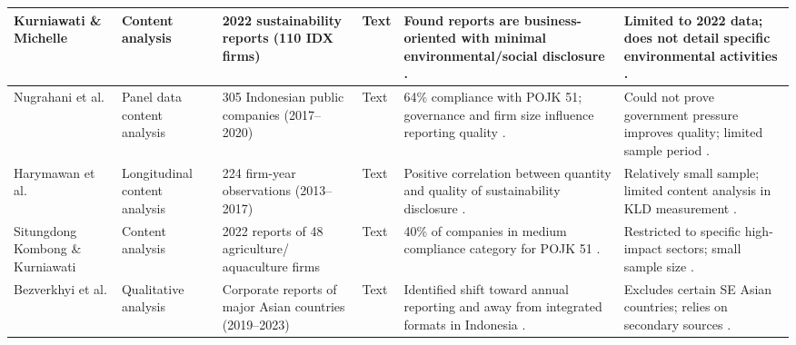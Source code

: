 \begin{landscape}
\begin{table}[p]
\begin{tabularx}{\linewidth}{|p{2.5cm}|p{2cm}|p{3cm}|p{1.8cm}|X|X|}
Kurniawati \& Michelle  \parencite{anggreni_dian_kurniawati_938acf6c} & Content analysis & 2022 sustainability reports (110 IDX firms) & Text & Found reports are business-oriented with minimal environmental/social disclosure  \parencite{anggreni_dian_kurniawati_938acf6c}. & Limited to 2022 data; does not detail specific environmental activities  \parencite{anggreni_dian_kurniawati_938acf6c}. \\ \hline
Nugrahani et al.  \parencite{tri_siwi_nugrahani_056a6914} & Panel data content analysis & 305 Indonesian public companies (2017–2020) & Text & 64\% compliance with POJK 51; governance and firm size influence reporting quality  \parencite{tri_siwi_nugrahani_056a6914}. & Could not prove government pressure improves quality; limited sample period  \parencite{tri_siwi_nugrahani_056a6914}. \\ \hline
Harymawan et al.  \parencite{iman_harymawan_2ef898fe} & Longitudinal content analysis & 224 firm-year observations (2013–2017) & Text & Positive correlation between quantity and quality of sustainability disclosure  \parencite{iman_harymawan_2ef898fe}. & Relatively small sample; limited content analysis in KLD measurement  \parencite{iman_harymawan_2ef898fe}. \\ \hline
Situngdong Kombong \& Kurniawati  \parencite{christine_bawaeda_sitandung_kombong_d03ec902} & Content analysis & 2022 reports of 48 agriculture/ aquaculture firms & Text & 40\% of companies in medium compliance category for POJK 51  \parencite{christine_bawaeda_sitandung_kombong_d03ec902}. & Restricted to specific high-impact sectors; small sample size  \parencite{christine_bawaeda_sitandung_kombong_d03ec902}. \\ \hline
Bezverkhyi et al.  \parencite{kostiantyn_bezverkhyi_e3819b1b} & Qualitative analysis & Corporate reports of major Asian countries (2019–2023) & Text & Identified shift toward annual reporting and away from integrated formats in Indonesia  \parencite{kostiantyn_bezverkhyi_e3819b1b}. & Excludes certain SE Asian countries; relies on secondary sources  \parencite{kostiantyn_bezverkhyi_e3819b1b}. \\ \hline

\end{tabularx}
\end{table}
\end{landscape}
